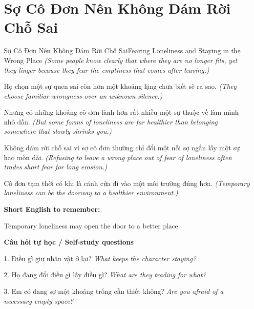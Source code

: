 \section{Sợ Cô Đơn Nên Không Dám Rời Chỗ Sai}
\begin{truyen}{Sợ Cô Đơn Nên Không Dám Rời Chỗ Sai}{Fearing Loneliness and Staying in the Wrong Place}
\textit{(Some people know clearly that where they are no longer fits, yet they linger because they fear the emptiness that comes after leaving.)}

Họ chọn một sự quen sai còn hơn một khoảng lặng chưa biết sẽ ra sao.
\textit{(They choose familiar wrongness over an unknown silence.)}

Nhưng có những khoảng cô đơn lành hơn rất nhiều một sự thuộc về làm mình nhỏ dần.
\textit{(But some forms of loneliness are far healthier than belonging somewhere that slowly shrinks you.)}

Không dám rời chỗ sai vì sợ cô đơn thường chỉ đổi một nỗi sợ ngắn lấy một sự hao mòn dài.
\textit{(Refusing to leave a wrong place out of fear of loneliness often trades short fear for long erosion.)}

\end{truyen}

\begin{baihoc}
Cô đơn tạm thời có khi là cánh cửa đi vào một môi trường đúng hơn.
\textit{(Temporary loneliness can be the doorway to a healthier environment.)}
\end{baihoc}

\begin{ghinhoanh}
\textbf{Short English to remember:}

Temporary loneliness may open the door to a better place.

\end{ghinhoanh}

\begin{tuhocnhanh}
\textbf{Câu hỏi tự học / Self-study questions}

1. Điều gì giữ nhân vật ở lại? \textit{What keeps the character staying?}

2. Họ đang đổi điều gì lấy điều gì? \textit{What are they trading for what?}

3. Em có đang sợ một khoảng trống cần thiết không? \textit{Are you afraid of a necessary empty space?}
\end{tuhocnhanh}
\ngancach

